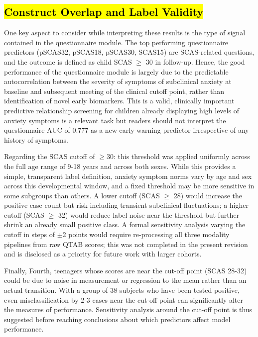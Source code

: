 \documentclass[10pt,letterpaper]{article}
\newcommand{\hlpar}[1]{\leavevmode\colorbox{yellow!30}{\parbox{\dimexpr\linewidth-2\fboxsep\relax}{#1}}\vspace{2pt}}
\begin{document}
                                                                                                                          \subsection*{\hl{Construct Overlap and Label Validity}}
                                                                                                          \hlpar{One key aspect to consider while interpreting these results is the type of signal contained in the
questionnaire module. The top performing questionnaire predictors (pSCAS32, pSCAS18,
pSCAS30, SCAS15) are SCAS-related questions, and the outcome is defined as child SCAS $\geq$
30 in follow-up. Hence, the good performance of the questionnaire module is largely due to the
predictable autocorrelation between the severity of symptoms of subclinical anxiety at baseline
and subsequent meeting of the clinical cutoff point, rather than identification of novel early
biomarkers. This is a valid, clinically important predictive relationship   screening for children
already displaying high levels of anxiety symptoms is a relevant task   but readers should not
interpret the questionnaire AUC of 0.777 as a new early-warning predictor irrespective of any
history of symptoms.}

                                                                                                          \hlpar{Regarding the SCAS cutoff of $\geq$30: this threshold was applied uniformly across the full age
range of 9-18 years and across both sexes. While this provides a simple, transparent label
definition, anxiety symptom norms vary by age and sex across this developmental window, and
a fixed threshold may be more sensitive in some subgroups than others. A lower cutoff (SCAS
$\geq$ 28) would increase the positive case count but risk including transient subclinical
fluctuations; a higher cutoff (SCAS $\geq$ 32) would reduce label noise near the threshold but
further shrink an already small positive class. A formal sensitivity analysis varying the cutoff in
steps of $\pm$2 points would require re-processing all three modality pipelines from raw QTAB
scores; this was not completed in the present revision and is disclosed as a priority for future
work with larger cohorts.}

                                                                                                          \hlpar{Finally, Fourth, teenagers whose scores are near the cut-off point (SCAS 28-32) could be due to noise in
measurement or regression to the mean rather than an actual transition. With a group of 38
subjects who have been tested positive, even misclassification by 2-3 cases near the cut-off
point can significantly alter the measures of performance. Sensitivity analysis around the cut-off
point is thus suggested before reaching conclusions about which predictors affect model
performance.}
\end{document}
